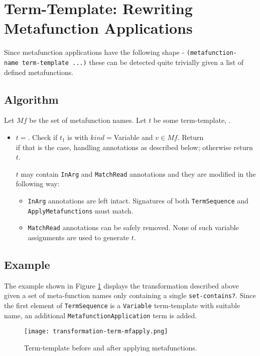\section{Term-Template: Rewriting Metafunction Applications}

Since metafunction applications have the following shape - \texttt{(metafunction-name\ term-template\ ...)} these can be detected quite trivially given a list of defined metafunctions. 

\subsection{Algorithm}
Let $Mf$ be the set of metafunction names. Let $t$ be some term-template, . 
\begin{itemize}
\item $t=$\space \TermSequence. Check if $t_1$ is \TermLiteral\space with $kind=$\space Variable and $v \in Mf$. Return \\ \ApplyMetafunction[$v$][$t$][false] if that is the case, handling annotations as described below; otherwise return $t$. 

$t$ may contain \texttt{InArg} and \texttt{MatchRead} annotations and they are modified in the following way:
\begin{itemize}
\item
\texttt{InArg} annotations are left intact. Signatures of both \texttt{TermSequence} and \texttt{ApplyMetafunctions} must match.
\item
\texttt{MatchRead} annotations can be safely removed. None of such variable assignments are used to generate $t$.
\end{itemize}
\end{itemize}
\subsection{Example}
The example shown in Figure \ref{transformation-term-mfapply} displays the transformation described above given a set of meta-function names only containing a single \texttt{set-contains?}. Since the first element of \texttt{TermSequence} is a \texttt{Variable} term-template with suitable name, an additional \texttt{MetafunctionApplication} term is added.

\begin{figure}[H]
\texttt{[image: transformation-term-mfapply.png]}
\caption{Term-template before and after applying metafunctions.}
\label{transformation-term-mfapply}
\end{figure}
